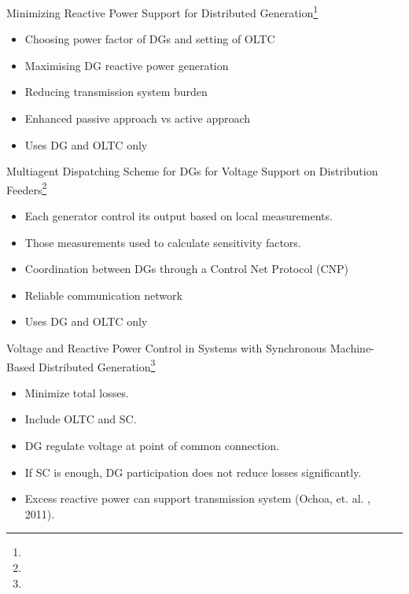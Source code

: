 \documentclass[10pt]{beamer}
\begin{document}
\begin{frame}{Minimizing Reactive Power Support for Distributed Generation\footnote{}}
\begin{itemize}
\item Choosing power factor of DGs and setting of OLTC
\item Maximising DG reactive power generation
\item Reducing transmission system burden
\item Enhanced passive approach vs active approach
\item Uses DG and OLTC only
\end{itemize}
\end{frame}

\begin{frame}{Multiagent Dispatching Scheme for DGs for Voltage Support on Distribution Feeders\footnote{}}
\begin{itemize}
\item Each generator control its output based on local measurements.
\item Those measurements used to calculate sensitivity factors.
\item Coordination between DGs through a Control Net Protocol (CNP)
\item Reliable communication network
\item Uses DG and OLTC only
\end{itemize}
\end{frame}


\begin{frame}{Voltage and Reactive Power Control in Systems with Synchronous Machine-Based Distributed Generation\footnote{}}
\begin{itemize}
\item Minimize total losses.
\item Include OLTC and SC.
\item DG regulate voltage at point of common connection.
\item If SC is enough, DG participation does not reduce losses significantly.
\item Excess reactive power can support transmission system (Ochoa, et. al. , 2011).
\end{itemize}
\end{frame}
\end{document}
